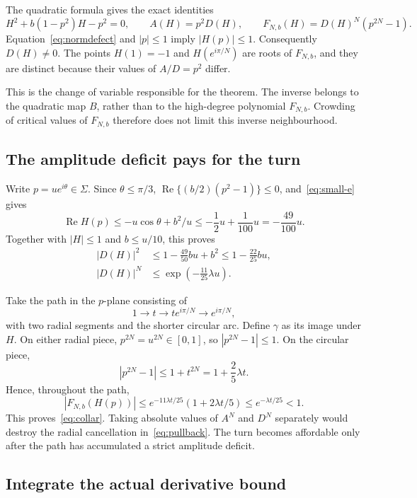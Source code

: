 \documentclass[11pt,a4paper]{article}
\theoremstyle{remark}\newtheorem{remark}[theorem]{Remark}
\newcommand{\Rea}{\operatorname{Re}}
\begin{document}
The quadratic formula gives the exact identities
\begin{equation}\label{eq:pullback}
 H^2+b(1-p^2)H-p^2=0,\qquad
 A(H)=p^2D(H),\qquad
 F_{N,b}(H)=D(H)^N(p^{2N}-1).
\end{equation}
Equation~\eqref{eq:normdefect} and $|p|\le1$ imply $|H(p)|\le1$.
Consequently $D(H)\ne0$. The points $H(1)=-1$ and
$H(e^{i\pi/N})$ are roots of $F_{N,b}$, and they are distinct because
their values of $A/D=p^2$ differ.

This is the change of variable responsible for the theorem. The inverse
belongs to the quadratic map $B$, rather than to the high-degree
polynomial $F_{N,b}$. Crowding of critical values of $F_{N,b}$ therefore does
not limit this inverse neighbourhood.

\subsection{The amplitude deficit pays for the turn}

Write $p=ue^{i\theta}\in\Sigma$. Since $\theta\le\pi/3$,
$\Rea\{(b/2)(p^2-1)\}\le0$, and~\eqref{eq:small-e} gives
\[
 \Rea H(p)\le-u\cos\theta+b^2/u
 \le-\frac12u+\frac1{100}u=-\frac{49}{100}u.
\]
Together with $|H|\le1$ and $b\le u/10$, this proves
\begin{align*}
 |D(H)|^2
 &\le1-\frac{49}{50}bu+b^2
 \le1-\frac{22}{25}bu,\\
 |D(H)|^N&\le\exp\left(-\frac{11}{25}\lambda u\right).
\end{align*}

Take the path in the $p$-plane consisting of
\[
 1\longrightarrow t\longrightarrow te^{i\pi/N}
 \longrightarrow e^{i\pi/N},
\]
with two radial segments and the shorter circular arc. Define $\gamma$ as
its image under $H$.
On either radial piece, $p^{2N}=u^{2N}\in[0,1]$, so
$|p^{2N}-1|\le1$. On the circular piece,
\[
 |p^{2N}-1|\le1+t^{2N}
 =1+\frac25\lambda t.
\]
Hence, throughout the path,
\[
 |F_{N,b}(H(p))|
 \le e^{-11\lambda t/25}(1+2\lambda t/5)
 \le e^{-\lambda t/25}<1.
\]
This proves~\eqref{eq:collar}. Taking absolute values of $A^N$ and $D^N$
separately would destroy the radial cancellation in~\eqref{eq:pullback}.
The turn becomes affordable only after the path has accumulated a strict
amplitude deficit.

\subsection{Integrate the actual derivative bound}
\end{document}
